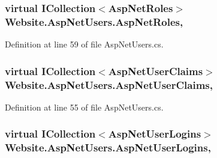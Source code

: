 \hypertarget{class_website_1_1_asp_net_users_a92a3cc1c78e0bde5ff926a55d90c0223}{}
\subsubsection[{Asp\+Net\+Roles}]{\setlength{\rightskip}{0pt plus 5cm}virtual I\+Collection$<${\bf Asp\+Net\+Roles}$>$ Website.\+Asp\+Net\+Users.\+Asp\+Net\+Roles\hspace{0.3cm}{\ttfamily [get]}, {\ttfamily [set]}}\label{class_website_1_1_asp_net_users_a92a3cc1c78e0bde5ff926a55d90c0223}


Definition at line 59 of file Asp\+Net\+Users.\+cs.

\hypertarget{class_website_1_1_asp_net_users_a9ae09b5fafc0417bcad82a2ec7b014e1}{}
\subsubsection[{Asp\+Net\+User\+Claims}]{\setlength{\rightskip}{0pt plus 5cm}virtual I\+Collection$<${\bf Asp\+Net\+User\+Claims}$>$ Website.\+Asp\+Net\+Users.\+Asp\+Net\+User\+Claims\hspace{0.3cm}{\ttfamily [get]}, {\ttfamily [set]}}\label{class_website_1_1_asp_net_users_a9ae09b5fafc0417bcad82a2ec7b014e1}


Definition at line 55 of file Asp\+Net\+Users.\+cs.

\hypertarget{class_website_1_1_asp_net_users_a67ac14091100408a70ae806077e49d1f}{}
\subsubsection[{Asp\+Net\+User\+Logins}]{\setlength{\rightskip}{0pt plus 5cm}virtual I\+Collection$<${\bf Asp\+Net\+User\+Logins}$>$ Website.\+Asp\+Net\+Users.\+Asp\+Net\+User\+Logins\hspace{0.3cm}{\ttfamily [get]}, {\ttfamily [set]}}\label{class_website_1_1_asp_net_users_a67ac14091100408a70ae806077e49d1f}


